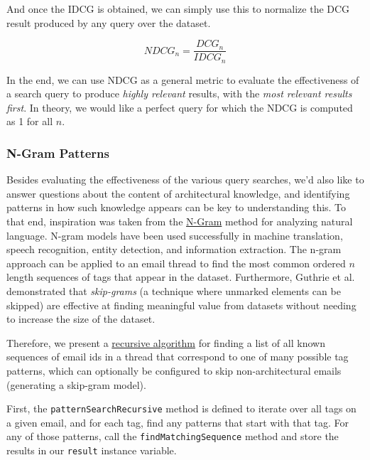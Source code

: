 \documentclass[a4paper, 12pt]{article}
\begin{document}
			And once the IDCG is obtained, we can simply use this to normalize the DCG result produced by any query over the dataset.
			
			\begin{equation}
				\tag{NDCG}
				NDCG_n = \frac{DCG_n}{IDCG_n}
				\label{eqn:ndcg}
			\end{equation}
		
			In the end, we can use NDCG as a general metric to evaluate the effectiveness of a search query to produce \textit{highly relevant} results, with the \textit{most relevant results first}. In theory, we would like a perfect query for which the NDCG is computed as 1 for all $ n $\autocite{denboon}.
			
		\subsubsection{N-Gram Patterns}
			Besides evaluating the effectiveness of the various query searches, we'd also like to answer questions about the content of architectural knowledge, and identifying patterns in how such knowledge appears can be key to understanding this. To that end, inspiration was taken from the \href{https://en.wikipedia.org/wiki/N-gram}{N-Gram} method for analyzing natural language. N-gram models have been used successfully in machine translation, speech recognition, entity detection, and information extraction\autocite{google-ngram}. The n-gram approach can be applied to an email thread to find the most common ordered $ n $ length sequences of tags that appear in the dataset. Furthermore, Guthrie et al. demonstrated that \textit{skip-grams} (a technique where unmarked elements can be skipped) are effective at finding meaningful value from datasets without needing to increase the size of the dataset\autocite{guthrie}.
			
			Therefore, we present a \hyperref[sec:pattern-algorithm]{recursive algorithm} for finding a list of all known sequences of email ids in a thread that correspond to one of many possible tag patterns, which can optionally be configured to skip non-architectural emails (generating a skip-gram model).
			
			First, the \texttt{patternSearchRecursive} method is defined to iterate over all tags on a given email, and for each tag, find any patterns that start with that tag. For any of those patterns, call the \texttt{findMatchingSequence} method and store the results in our \texttt{result} instance variable.
			
\end{document}
